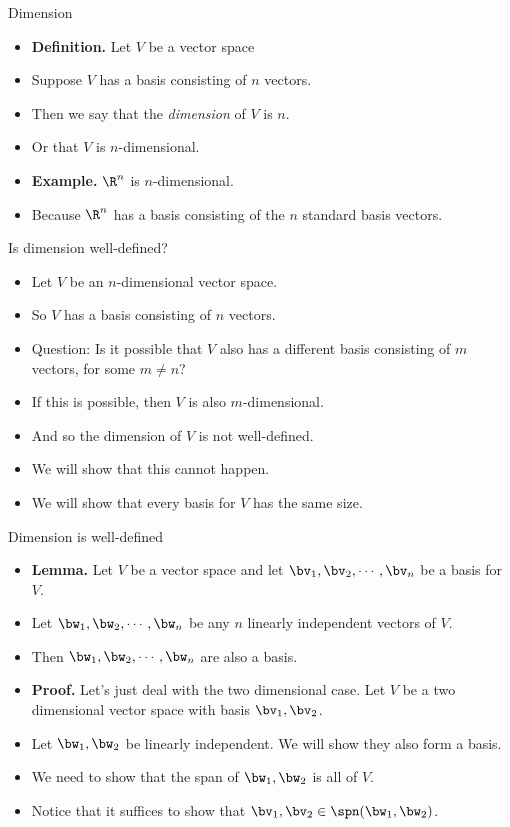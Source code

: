 \documentclass{beamer}
\begin{document}
\begin{frame}{Dimension}

\begin{itemize}
\item \textbf{Definition.} Let $V$ be a vector space
\item Suppose $V$ has a basis consisting of $n$ vectors.
\item Then we say that the \emph{dimension} of $V$ is $n$.
\item Or that $V$ is $n$-dimensional.
\item \textbf{Example.} $\R^n$ is $n$-dimensional.
\item Because $\R^n$ has a basis consisting of the $n$ standard basis vectors.
\end{itemize}

\end{frame}
\begin{frame}{Is dimension well-defined?}

\begin{itemize}
\item Let $V$ be an $n$-dimensional vector space.
\item So $V$ has a basis consisting of $n$ vectors.
\item Question: Is it possible that $V$ also has a different basis
consisting of $m$ vectors, for some $m\not=n$?
\item If this is possible, then $V$ is also $m$-dimensional.
\item And so the dimension of $V$ is not well-defined.
\item We will show that this cannot happen.
\item We will show that every basis for $V$ has the same size.
\end{itemize}

\end{frame}
\begin{frame}{Dimension is well-defined}

\begin{itemize}
\item \textbf{Lemma.} Let $V$ be a vector space and let $\bv_1,\bv_2,\cdots,\bv_n$ be a basis for $V$.
\item Let $\bw_1,\bw_2,\cdots,\bw_n$  be any $n$ linearly independent vectors of $V$.
\item Then $\bw_1,\bw_2,\cdots,\bw_n$ are also a basis.
\item \textbf{Proof.} Let's just deal with the two dimensional case.  Let $V$ be a two dimensional
vector space with basis $\bv_1,\bv_2$.
\item Let $\bw_1,\bw_2$ be linearly
independent. We will show they also form a basis.
\item We need to show that the span of $\bw_1,\bw_2$ is all of $V$.
\item Notice that it suffices to show that $\bv_1,\bv_2\in\spn(\bw_1,\bw_2)$.
\end{itemize}

\end{frame}
\end{document}
